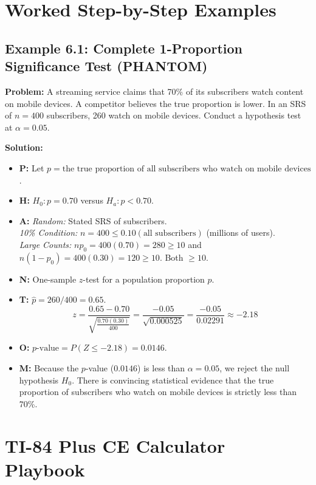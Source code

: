 \section{Worked Step-by-Step Examples}

\subsection*{Example 6.1: Complete 1-Proportion Significance Test (PHANTOM)}
\textbf{Problem:} A streaming service claims that 70\% of its subscribers watch content on mobile devices. A competitor believes the true proportion is lower. In an SRS of $n = 400$ subscribers, 260 watch on mobile devices. Conduct a hypothesis test at $\alpha = 0.05$.

\textbf{Solution:}
\begin{itemize}[leftmargin=1.2em]
  \item \textbf{P:} Let $p = \text{the true proportion of all subscribers who watch on mobile devices}$.
  \item \textbf{H:} $H_0: p = 0.70$ versus $H_a: p < 0.70$.
  \item \textbf{A:}
  \textit{Random:} Stated SRS of subscribers.\\
  \textit{10\% Condition:} $n = 400 \le 0.10(\text{all subscribers})$ (millions of users).\\
  \textit{Large Counts:} $n p_0 = 400(0.70) = 280 \ge 10$ and $n(1-p_0) = 400(0.30) = 120 \ge 10$. Both $\ge 10$.
  \item \textbf{N:} One-sample $z$-test for a population proportion $p$.
  \item \textbf{T:} $\hat{p} = 260/400 = 0.65$.
  \[ z = \frac{0.65 - 0.70}{\sqrt{\frac{0.70(0.30)}{400}}} = \frac{-0.05}{\sqrt{0.000525}} = \frac{-0.05}{0.02291} \approx -2.18 \]
  \item \textbf{O:} $p\text{-value} = P(Z \le -2.18) = \mathbf{0.0146}$.
  \item \textbf{M:} Because the $p$-value ($0.0146$) is less than $\alpha = 0.05$, we reject the null hypothesis $H_0$. There is convincing statistical evidence that the true proportion of subscribers who watch on mobile devices is strictly less than 70\%.
\end{itemize}

\section{TI-84 Plus CE Calculator Playbook}

